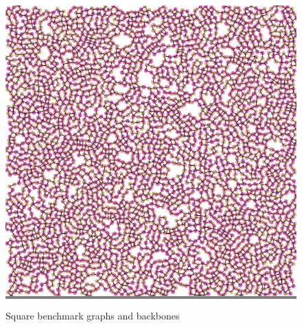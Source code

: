 \documentclass{article}
\begin{document}
\begin{figure}
\begin{minipage}{0.3\textwidth}
    \end{minipage}
    \hspace{\fill}
    \begin{minipage}{0.3\textwidth}
    \colorbox{gray}{\includegraphics[width=\linewidth]{./images/square_6_bb_1.png}}
    \end{minipage}
    \vskip 0.1in

    \caption{Square benchmark graphs and backbones}
    \label{squaresb}
\end{figure}

\end{document}
